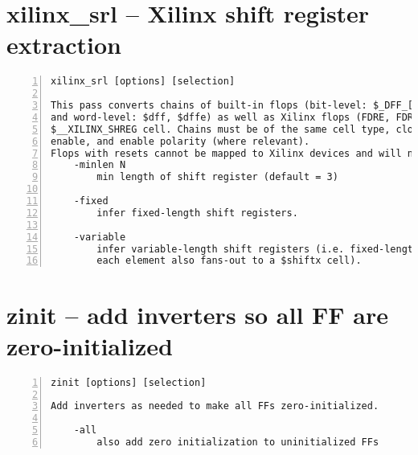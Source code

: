 \section{xilinx\_srl -- Xilinx shift register extraction}
\label{cmd:xilinx_srl}
\begin{lstlisting}[numbers=left,frame=single]
    xilinx_srl [options] [selection]

This pass converts chains of built-in flops (bit-level: $_DFF_[NP]_, $_DFFE_*
and word-level: $dff, $dffe) as well as Xilinx flops (FDRE, FDRE_1) into a
$__XILINX_SHREG cell. Chains must be of the same cell type, clock, clock polarity,
enable, and enable polarity (where relevant).
Flops with resets cannot be mapped to Xilinx devices and will not be inferred.
    -minlen N
        min length of shift register (default = 3)

    -fixed
        infer fixed-length shift registers.

    -variable
        infer variable-length shift registers (i.e. fixed-length shifts where
        each element also fans-out to a $shiftx cell).
\end{lstlisting}

\section{zinit -- add inverters so all FF are zero-initialized}
\label{cmd:zinit}
\begin{lstlisting}[numbers=left,frame=single]
    zinit [options] [selection]

Add inverters as needed to make all FFs zero-initialized.

    -all
        also add zero initialization to uninitialized FFs
\end{lstlisting}

